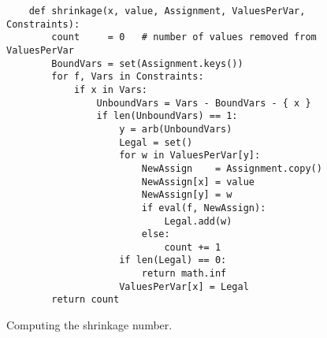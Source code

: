 \begin{figure}[!ht]
\centering
\begin{verbatim}
    def shrinkage(x, value, Assignment, ValuesPerVar, Constraints):
        count     = 0   # number of values removed from ValuesPerVar
        BoundVars = set(Assignment.keys())
        for f, Vars in Constraints:
            if x in Vars:
                UnboundVars = Vars - BoundVars - { x }
                if len(UnboundVars) == 1:
                    y = arb(UnboundVars)
                    Legal = set()
                    for w in ValuesPerVar[y]:
                        NewAssign    = Assignment.copy()
                        NewAssign[x] = value
                        NewAssign[y] = w
                        if eval(f, NewAssign):
                            Legal.add(w)
                        else:
                            count += 1
                    if len(Legal) == 0:
                        return math.inf
                    ValuesPerVar[x] = Legal
        return count 
\end{verbatim}
\vspace*{-0.3cm}
\caption{Computing the shrinkage number.}
\label{fig:Constraint-Propagation-Solver.ipynb:shrinkage}
\end{figure}


